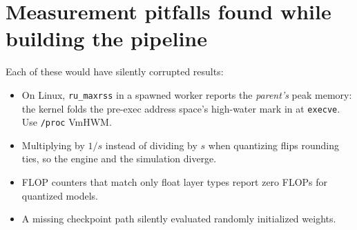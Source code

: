 \documentclass[10pt]{article}
\begin{document}
\appendix
\section{Measurement pitfalls found while building the pipeline}\label{app:pitfalls}
Each of these would have silently corrupted results:
\begin{itemize}
  \item On Linux, \texttt{ru\_maxrss} in a spawned worker reports the \emph{parent's} peak
  memory: the kernel folds the pre-exec address space's high-water mark in at
  \texttt{execve}. Use \texttt{/proc} VmHWM.
  \item Multiplying by $1/s$ instead of dividing by $s$ when quantizing flips rounding ties,
  so the engine and the simulation diverge.
  \item FLOP counters that match only float layer types report zero FLOPs for quantized models.
  \item A missing checkpoint path silently evaluated randomly initialized weights.
\end{itemize}



\end{document}
